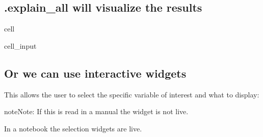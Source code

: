 \documentclass[letterpaper,10pt,english]{jupyterBook}
\begin{document}
\subsection{.explain\_all will visualize the results}
\label{\detokenize{content/06_ModelAnalytics/Attribution:explain-all-will-visualize-the-results}}
\begin{sphinxuseclass}{cell}\begin{sphinxVerbatimInput}

\begin{sphinxuseclass}{cell_input}
\begin{sphinxVerbatim}[commandchars=\\\{\}]
  
\end{sphinxVerbatim}

\end{sphinxuseclass}\end{sphinxVerbatimInput}

\end{sphinxuseclass}

\subsection{Or we can use interactive widgets}
\label{\detokenize{content/06_ModelAnalytics/Attribution:or-we-can-use-interactive-widgets}}
\sphinxAtStartPar
This allows the user to select the specific variable of interest and what to display:

\begin{sphinxadmonition}{note}{Note:}
\sphinxAtStartPar
If this is read in a manual the widget is not live.

\sphinxAtStartPar
In a notebook the selection widgets are live.
\end{sphinxadmonition}
\end{document}
